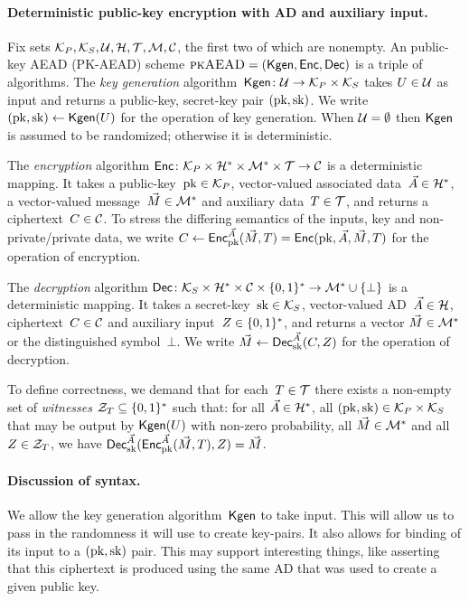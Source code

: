 \paragraph{Deterministic public-key encryption with AD and auxiliary input. }
Fix sets $\mathcal{K}_P, \mathcal{K}_S, \mathcal{U}, \mathcal{H}, \mathcal{T},\mathcal{M},\mathcal{C}$, the first two of which are nonempty.  An public-key AEAD
(PK-AEAD) scheme $\textsc{pkAEAD}=(\mathsf{Kgen},{\mathsf{Enc}},{\mathsf{Dec}})$ is a triple of algorithms.  The \emph{key generation} algorithm~$\mathsf{Kgen}\colon\mathcal{U}\to\mathcal{K}_P\times\mathcal{K}_S$ takes $U \in \mathcal{U}$ as input and returns a public-key, secret-key pair $(\mathrm{pk},\mathrm{sk})$.  We write $(\mathrm{pk},\mathrm{sk})\gets\mathsf{Kgen}(U)$ for the operation of key generation.  When $\mathcal{U} = \emptyset$ then $\mathsf{Kgen}$ is assumed to be randomized; otherwise it is deterministic.

The \emph{encryption} algorithm ${\mathsf{Enc}} \colon \mathcal{K}_P \times \mathcal{H}^* \times \mathcal{M}^* \times \mathcal{T} \to \mathcal{C}$ is a deterministic mapping.  It takes a public-key~$\mathrm{pk}\in\mathcal{K}_P$, vector-valued associated data~$\vec{A} \in \mathcal{H}^*$,  a vector-valued message~$\vec{M} \in \mathcal{M}^*$ and auxiliary data~$T \in \mathcal{T}$, and returns a ciphertext~$C \in \mathcal{C}$. 
To stress the differing semantics of the inputs, key and non-private/private data, we write $C\gets{\mathsf{Enc}}_{\mathrm{pk}}^{\vec{A}}(\vec{M},T) ={\mathsf{Enc}}(\mathrm{pk},\vec{A}, \vec{M},T)$ for the operation of encryption. 


The \emph{decryption} algorithm ${\mathsf{Dec}} \colon \mathcal{K}_S \times \mathcal{H}^* \times \mathcal{C} \times \{0,1\}^* \to \mathcal{M}^* \cup \{\bot\}$ is a deterministic mapping.  It takes a secret-key~$\mathrm{sk}\in\mathcal{K}_S$, vector-valued AD~$\vec{A} \in \mathcal{H}$, ciphertext~$C \in \mathcal{C}$ and auxiliary input~$Z\in\{0,1\}^*$, and returns a vector $\vec{M} \in \mathcal{M}^*$ or the distinguished symbol~$\bot$.  We write $\vec{M} \gets {\mathsf{Dec}}_{\mathrm{sk}}^{\vec{A}}(C,Z)$ for the operation of decryption.   

To define correctness, we demand that for each~$T\in\mathcal{T}$ there exists a non-empty set of \emph{witnesses} $\mathcal{Z}_T \subseteq \{0,1\}^*$ such that:  for all $\vec{A}\in\mathcal{H}^*$, all $(\mathrm{pk},\mathrm{sk})\in\mathcal{K}_P\times\mathcal{K}_S$ that may be output by $\mathsf{Kgen}(U)$ with non-zero probability, all $\vec{M} \in \mathcal{M}^*$ and all $Z\in\mathcal{Z}_T$, we have ${\mathsf{Dec}}_{\mathrm{sk}}^{\vec{A}}({\mathsf{Enc}}_{\mathrm{pk}}^{\vec{A}}(\vec{M},T),Z)=\vec{M}$. 

\paragraph{Discussion of syntax. } 
We allow the key generation algorithm~$\mathsf{Kgen}$ to take input.  This will allow us to pass in the randomness it will use to create key-pairs.  It also allows for binding of its input to a $(\mathrm{pk},\mathrm{sk})$ pair.  This may support interesting things, like asserting that this ciphertext is produced using the same AD that was used to create a given public key.   

